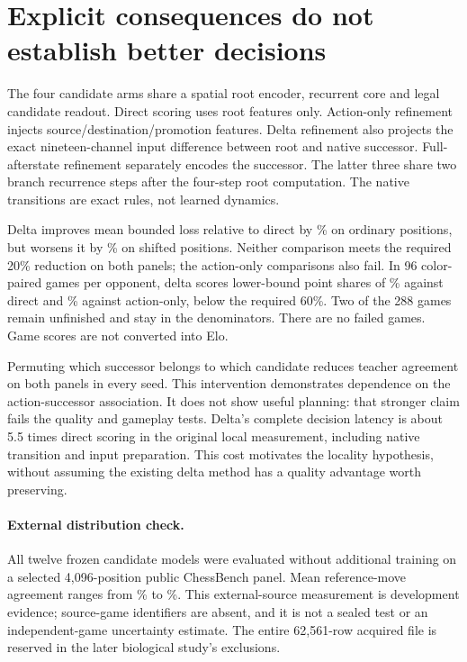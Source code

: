 \documentclass{article}
\begin{document}
\section{Explicit consequences do not establish better decisions}
The four candidate arms share a spatial root encoder, recurrent core and legal
candidate readout. Direct scoring uses root features only. Action-only refinement
injects source/destination/promotion features. Delta refinement also projects the
exact nineteen-channel input difference between root and native successor.
Full-afterstate refinement separately encodes the successor. The latter three
share two branch recurrence steps after the four-step root computation.
The native transitions are exact rules, not learned dynamics.



Delta improves mean bounded loss relative to direct by \DeltaDevReduction\%
on ordinary positions, but worsens it by \DeltaShiftWorsening\% on shifted
positions. Neither comparison meets the required 20\% reduction on both panels;
the action-only comparisons also fail. In 96 color-paired games per opponent,
delta scores lower-bound point shares of \DeltaDirectPoints\% against direct
and \DeltaActionPoints\% against action-only, below the required 60\%.
Two of the 288 games remain unfinished and stay in the denominators. There are
no failed games. Game scores are not converted into Elo.

Permuting which successor belongs to which candidate reduces teacher agreement
on both panels in every seed. This intervention demonstrates dependence on the
action-successor association. It does not show useful planning: that stronger
claim fails the quality and gameplay tests. Delta's complete decision latency
is about 5.5 times direct scoring in the original local measurement, including
native transition and input preparation. This cost motivates the locality
hypothesis, without assuming the existing delta method has a quality advantage
worth preserving.

\paragraph{External distribution check.}
All twelve frozen candidate models were evaluated without additional training
on a selected 4,096-position public ChessBench panel. Mean reference-move
agreement ranges from \TransferMin\% to \TransferMax\%. This external-source
measurement is development evidence; source-game identifiers are absent, and
it is not a sealed test or an independent-game uncertainty estimate. The entire
62,561-row acquired file is reserved in the later biological study's exclusions.
\end{document}

